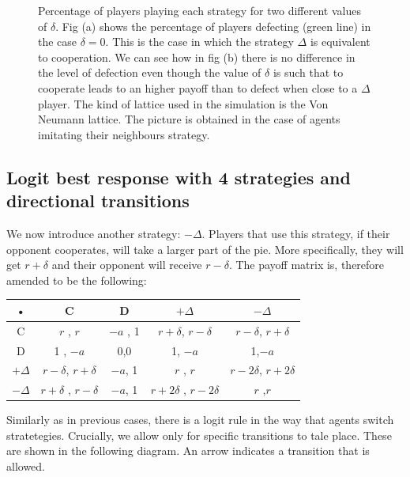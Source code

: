 \documentclass{article}
\begin{document}
\begin{figure}[htbp]
\begin{subfigure}[t]{0.47\textwidth}
  \label{fig:IM2_delta} 
\end{subfigure}
\caption{Percentage of players playing each strategy for two different values of $\delta$.
Fig (a) shows the percentage of players defecting (green line) in the case $\delta =0$. This is the case in which the strategy $\Delta$ is equivalent to cooperation.
We can see how in fig (b) there is no difference in the level of defection even though the value of $\delta$ is such that to cooperate leads to an higher payoff than to defect when close to a $\Delta$ player.
The kind of lattice used in the simulation is the Von Neumann lattice.
The picture is obtained in the case of agents imitating their neighbours strategy.
}
\label{fig:IM2}
\end{figure} 


\subsection{Logit best response with 4 strategies and directional transitions}
We now introduce another strategy: $-\Delta$. Players that use this strategy, if their opponent cooperates, will take a larger part of the pie. More specifically, they will get $r+\delta$ and their opponent will receive $r-\delta$. The payoff matrix is, therefore amended to be the following:
\begin{center}
\begin{tabular}{|c|c|c|c|c|}
\hline 
• & C & D &$+\Delta$ & $-\Delta$  \\ 
\hline 
C & $r$ , $r$ & $-a$ , 1 & $r+\delta$, $r-\delta$ & $r-\delta$, $r+\delta$ \\ 
\hline 
D & 1 , $-a$ & 0,0 & 1, $-a$ & 1,$-a$\\ 
\hline 
$+\Delta$ & $r -\delta$, $r+\delta$ & $-a$, 1 & $r$ , $r$& $r-2\delta$, $r+2\delta$ \\ 
\hline 
$-\Delta$ & $r+\delta$ , $r-\delta$ & $-a$, 1 & $r+2\delta$ , $r-2\delta$ & $r$ ,$ r$\\ 
\hline 
\end{tabular} 
\end{center}

Similarly as in previous cases, there is a logit rule in the way that agents switch stratetegies. Crucially, we allow only for specific transitions to tale place. These are shown in the following diagram. An arrow indicates a transition that is allowed. 
\end{document}
